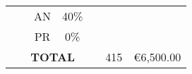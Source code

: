 \begin{table}[p]
\begin{center}
{\begin{tabular}{|c|l|c|c|l|l|l|}
\multicolumn{ 1}{|c|}{} & \multicolumn{ 1}{l|}{} & AN & 40\% & \multicolumn{ 1}{l|}{} & \multicolumn{ 1}{l|}{} & \multicolumn{ 1}{l|}{} \\ \cline{ 3- 4}
\multicolumn{ 1}{|c|}{} & \multicolumn{ 1}{l|}{} & PR & 0\% & \multicolumn{ 1}{l|}{} & \multicolumn{ 1}{l|}{} & \multicolumn{ 1}{l|}{} \\ \hline
\multicolumn{ 5}{|c|}{\textbf{TOTAL}} & \multicolumn{1}{c|}{415} & \multicolumn{1}{c|}{\textgreek{\euro}6,500.00} \\ \hline
\end{tabular}
}
\end{center}
\end{table}

